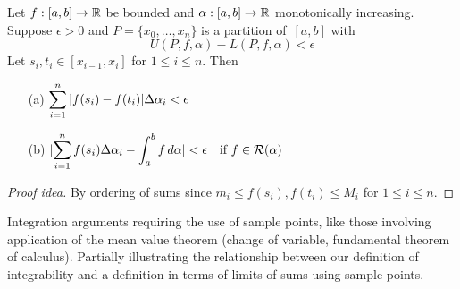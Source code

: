 \begin{thm}
Let \(f:[a,b]\to\mathbb{R}\) be bounded and \(\alpha:[a,b]\to\mathbb{R}\) monotonically increasing. Suppose \(\epsilon>0\) and \(P=\{x_0,\ldots,x_n\}\) is a partition of~\([a,b]\) with
\[U(P,f,\alpha)-L(P,f,\alpha)<\epsilon\]
Let \(s_i,t_i\in[x_{i-1},x_i]\) for \(1\le i\le n\). Then
\begin{enumerate}[itemsep=0pt]
\item[(a)] \(\displaystyle\sum_{i=1}^n|{f(s_i)-f(t_i)}|\Delta\alpha_i<\epsilon\)
\item[(b)] \(\displaystyle|{\sum_{i=1}^n f(s_i)\Delta\alpha_i-\int_a^b f\,d\alpha}|<\epsilon\quad\text{if }f\in\mathcal{R}(\alpha)\)
\end{enumerate}
\end{thm}
\begin{proof}[Proof idea] By ordering of sums since \(m_i\le f(s_i),f(t_i)\le M_i\) for \(1\le i\le n\).
\end{proof}
\begin{app}
Integration arguments requiring the use of sample points, like those involving application of the mean value theorem (change of variable, fundamental theorem of calculus). Partially illustrating the relationship between our definition of integrability and a definition in terms of limits of sums using sample points.
\end{app}

